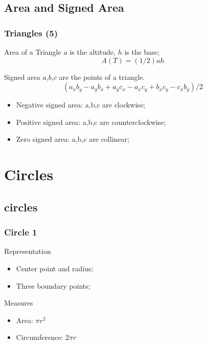 \documentclass{beamer}
\begin{document}
\subsection{Area and Signed Area}
\begin{frame}
  \frametitle{Triangles (5)}
  \begin{block}{Area of a Triangle}
    $a$ is the altitude, $h$ is the base;
    \begin{equation*}
      A(T) = (1/2)ah
    \end{equation*}
  \end{block}

  \begin{block}{Signed area}
    $a$,$b$,$c$ are the points of a triangle. 
    \begin{equation*}
      (a_xb_y - a_yb_x + a_yc_x - a_xc_y + b_xc_y - c_xb_y)/2
    \end{equation*}
  \end{block}
  {\smaller
    \begin{itemize}
    \item Negative signed area: a,b,c are clockwise;
    \item Positive signed area: a,b,c are counterclockwise;
    \item Zero signed area: a,b,c are collinear;
    \end{itemize}
  }
\end{frame}

\section{Circles}
\subsection{circles}


\begin{frame}
  \frametitle{Circle 1}
  \begin{block}{Representation}
    \begin{itemize}
      \item Center point and radius;
      \item Three boundary points;
    \end{itemize}
  \end{block}
  \begin{block}{Measures}
    \begin{itemize}
    \item Area: $\pi r^2$
    \item Circumference: $2\pi r$
    \end{itemize}
  \end{block}
\end{frame}
\end{document}

